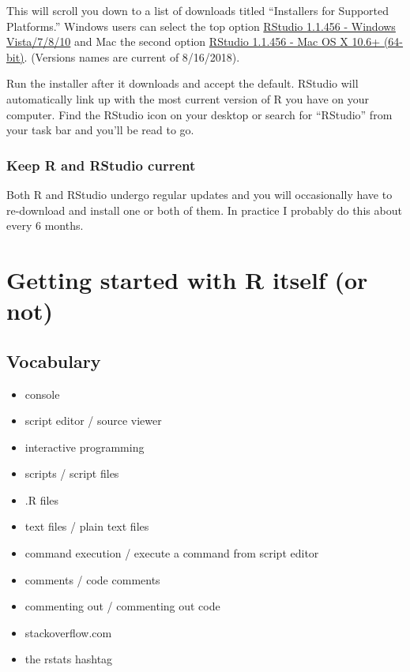 \documentclass[
]{book}
\providecommand{\tightlist}{%
  \setlength{\itemsep}{0pt}\setlength{\parskip}{0pt}}
\begin{document}
This will scroll you down to a list of downloads titled ``Installers for Supported Platforms.'' Windows users can select the top option \href{https://download1.rstudio.org/RStudio-1.1.456.exe}{RStudio 1.1.456 - Windows Vista/7/8/10} and Mac the second option \href{https://download1.rstudio.org/RStudio-1.1.456.dmg}{RStudio 1.1.456 - Mac OS X 10.6+ (64-bit)}. (Versions names are current of 8/16/2018).

Run the installer after it downloads and accept the default. RStudio will automatically link up with the most current version of R you have on your computer. Find the RStudio icon on your desktop or search for ``RStudio'' from your task bar and you'll be read to go.

\hypertarget{keep-r-and-rstudio-current}{%
\subsection{Keep R and RStudio current}\label{keep-r-and-rstudio-current}}

Both R and RStudio undergo regular updates and you will occasionally have to re-download and install one or both of them. In practice I probably do this about every 6 months.

\hypertarget{getting-started-with-r-itself-or-not}{%
\chapter*{Getting started with R itself (or not)}\label{getting-started-with-r-itself-or-not}}

\hypertarget{vocabulary-2}{%
\section*{Vocabulary}\label{vocabulary-2}}

\begin{itemize}
\tightlist
\item
  console
\item
  script editor / source viewer
\item
  interactive programming
\item
  scripts / script files
\item
  .R files
\item
  text files / plain text files
\item
  command execution / execute a command from script editor
\item
  comments / code comments
\item
  commenting out / commenting out code
\item
  stackoverflow.com
\item
  the rstats hashtag
\end{itemize}
\end{document}
